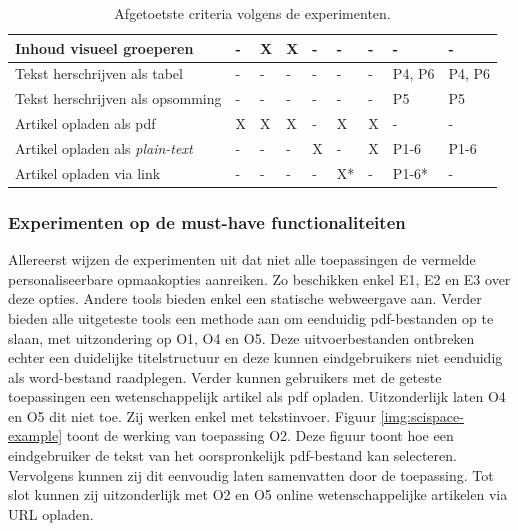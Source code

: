 \begin{table}[H]
\begin{tabular}{ | m{8cm} | m{0.5cm} | m{0.5cm} | m{0.5cm} | m{0.5cm} | m{0.5cm} | m{0.5cm} | m{1cm} | m{1cm} | }
		Inhoud visueel groeperen & - & X & X & - & - & - & - & - \\ \hline
		Tekst herschrijven als tabel & - & - & - & - & - & - & P4, P6 & P4, P6 \\ \hline
		Tekst herschrijven als opsomming & - & - & - & - & - & - & P5 & P5 \\ \hline
		Artikel opladen als pdf & X & X & X & - & X & X & - & - \\ \hline
		Artikel opladen als \textit{plain-text} & - & - & - & X & - & X & P1-6 & P1-6 \\ \hline
		Artikel opladen via link & - & - & - & - & X* & - & P1-6* & - \\ \hline
	\end{tabular}
	\caption{Afgetoetste criteria volgens de experimenten.}
	\label{table:afgetoetste-criteria}
\end{table}

\subsubsection{Experimenten op de must-have functionaliteiten}

Allereerst wijzen de experimenten uit dat niet alle toepassingen de vermelde personaliseerbare opmaakopties aanreiken. Zo beschikken enkel E1, E2 en E3 over deze opties. Andere tools bieden enkel een statische webweergave aan. Verder bieden alle uitgeteste tools een methode aan om eenduidig pdf-bestanden op te slaan, met uitzondering op O1, O4 en O5. Deze uitvoerbestanden ontbreken echter een duidelijke titelstructuur en deze kunnen eindgebruikers niet eenduidig als word-bestand raadplegen. Verder kunnen gebruikers met de geteste toepassingen een wetenschappelijk artikel als pdf opladen. Uitzonderlijk laten O4 en O5 dit niet toe. Zij werken enkel met tekstinvoer. Figuur \ref{img:scispace-example} toont de werking van toepassing O2. Deze figuur toont hoe een eindgebruiker de tekst van het oorspronkelijk pdf-bestand kan selecteren. Vervolgens kunnen zij dit eenvoudig laten samenvatten door de toepassing. Tot slot kunnen zij uitzonderlijk met O2 en O5 online wetenschappelijke artikelen via URL opladen.

